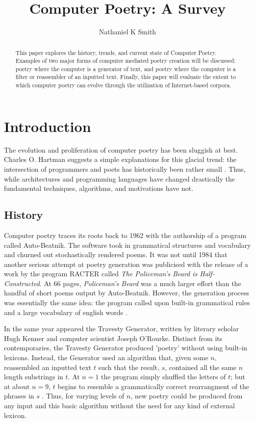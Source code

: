 \documentclass[10pt]{article}
\title{Computer Poetry: A Survey}
\author{Nathaniel K Smith}
\begin{document}
\maketitle

\begin{abstract}
This paper explores the history, trends, and current state of Computer Poetry.
Examples of two major forms of computer mediated poetry creation will be
discussed: poetry where the computer is a generator of text, and poetry where
the computer is a filter or reassembler of an inputted text. Finally, this
paper will evaluate the extent to which computer poetry can evolve through the
utilization of Internet-based corpora.
\end{abstract}

\section{Introduction} 
The evolution and proliferation of computer poetry has been sluggish at best.
Charles O. Hartman suggests a simple explanations for this glacial trend: the
intersection of programmers and poets has historically been rather small
\cite{Hart96}. Thus, while architectures and programming languages have changed
drastically the fundamental techniques, algorithms, and motivations have not.
\subsection{History} 
Computer poetry traces its roots back to 1962 with the authorship of a program
called Auto-Beatnik. The software took in grammatical structures and vocabulary
and churned out stochastically rendered poems. It was not until 1984 that
another serious attempt at poetry generation was publicised with the release of
a work by the program RACTER called \emph{The Policeman's Beard is Half-
Constructed}. At 66 pages, \emph{Policeman's Beard} was a much larger effort
than the handful of short poems output by Auto-Beatnik. However, the generation
process was essentially the same idea: the program called upon built-in grammatical
rules and a large vocabulary of english words \cite{Chamb84}. 

In the same year appeared the Travesty Generator, written by literary scholar
Hugh Kenner and computer scientist Joseph O'Rourke. Distinct from its
contemporaries, the Travesty Generator produced 'poetry' without using built-in
lexicons. Instead, the Generator used an algorithm that, given some $n$,
reassembled an inputted text $t$ such that the result, $s$, contained all the
same $n$ length substrings in $t$. At $n = 1$ the program simply shuffled the
letters of $t$; but at about $n = 9$, $t$ begins to resemble a grammatically
correct rearrangment of the phrases in $s$ \cite{Hart96}. Thus, for varying
levels of $n$, new poetry could be produced from any input and this basic
algorithm without the need for any kind of external lexicon.
\end{document}
